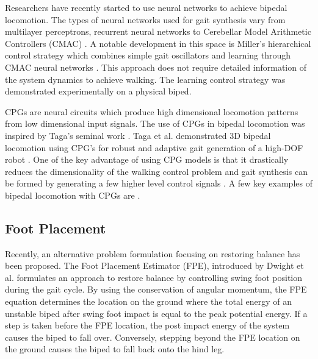 Researchers have recently started to use neural networks to achieve bipedal locomotion. The types of neural networks used for gait synthesis vary from multilayer perceptrons, recurrent neural networks to Cerebellar Model Arithmetic Controllers (CMAC) \cite{Katic2003}. A notable development in this space is Miller's hierarchical control strategy which combines simple gait oscillators and learning through CMAC neural networks \cite{Miller1994,Kun1996}. This approach does not require detailed information of the system dynamics to achieve walking. The learning control strategy was demonstrated experimentally on a physical biped.  

CPGs are neural circuits which produce high dimensional locomotion patterns from low dimensional input signals. The use of CPGs in bipedal locomotion was inspired by Taga's seminal work \cite{Taga1991,Taga1998}. Taga et al. demonstrated 3D bipedal locomotion using CPG's for robust and adaptive gait generation of a high-DOF robot \cite{Miyakoshi1998}. One of the key advantage of using CPG models is that it drastically reduces the dimensionality of the walking control problem and gait synthesis can be formed by generating a few higher level control signals \cite{Ijspreet2008}. A few key examples of bipedal locomotion with CPGs are \cite{Morimoto2006,Righetti2006,Aoi2005}.


\subsection{Foot Placement} %
\label{sub:related_foot_placement}
Recently, an alternative problem formulation focusing on restoring balance has been proposed. The Foot Placement Estimator (FPE), introduced by Dwight et al. \cite{Wight:2008ii} formulates an approach to restore balance by controlling swing foot position during the gait cycle. By using the conservation of angular momentum, the FPE equation determines the location on the ground where the total energy of an unstable biped after swing foot impact is equal to the peak potential energy. If a step is taken before the FPE location, the post impact energy of the system causes the biped to fall over. Conversely, stepping beyond the FPE location on the ground causes the biped to fall back onto the hind leg.

